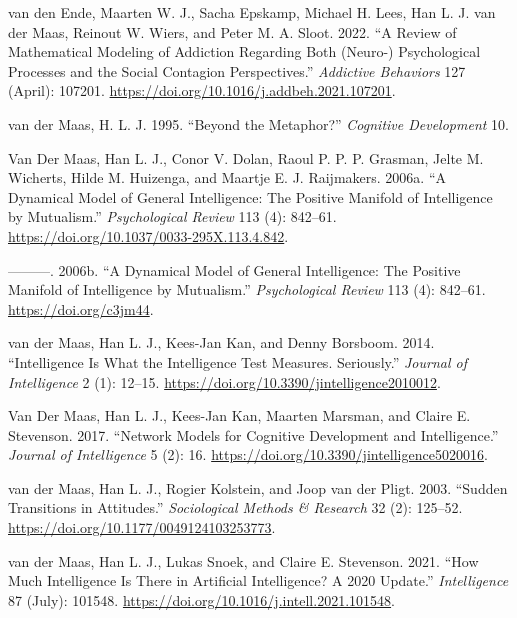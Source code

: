 \documentclass[
  a4paper,
  DIV=11,
  numbers=noendperiod,
  oneside]{scrreprt}
\newlength{\cslhangindent}
\newlength{\cslentryspacingunit} %
\newenvironment{CSLReferences}[2] %
 {%
  \setlength{\parindent}{0pt}
  \ifodd #1
  \let\oldpar\par
  \def\par{\hangindent=\cslhangindent\oldpar}
  \fi
  \setlength{\parskip}{#2\cslentryspacingunit}
 }%
 {}
\begin{document}
\begin{CSLReferences}{1}{0}
\leavevmode{}%
van den Ende, Maarten W. J., Sacha Epskamp, Michael H. Lees, Han L. J.
van der Maas, Reinout W. Wiers, and Peter M. A. Sloot. 2022. {``A Review
of Mathematical Modeling of Addiction Regarding Both (Neuro-)
Psychological Processes and the Social Contagion Perspectives.''}
\emph{Addictive Behaviors} 127 (April): 107201.
\url{https://doi.org/10.1016/j.addbeh.2021.107201}.

\leavevmode{}%
van der Maas, H. L. J. 1995. {``Beyond the Metaphor?''} \emph{Cognitive
Development} 10.

\leavevmode{}%
Van Der Maas, Han L. J., Conor V. Dolan, Raoul P. P. P. Grasman, Jelte
M. Wicherts, Hilde M. Huizenga, and Maartje E. J. Raijmakers. 2006a.
{``A Dynamical Model of General Intelligence: The Positive Manifold of
Intelligence by Mutualism.''} \emph{Psychological Review} 113 (4):
842--61. \url{https://doi.org/10.1037/0033-295X.113.4.842}.

\leavevmode{}%
---------. 2006b. {``A Dynamical Model of General Intelligence: {The}
Positive Manifold of Intelligence by Mutualism.''} \emph{Psychological
Review} 113 (4): 842--61. \url{https://doi.org/c3jm44}.

\leavevmode{}%
van der Maas, Han L. J., Kees-Jan Kan, and Denny Borsboom. 2014.
{``Intelligence {Is What} the {Intelligence Test Measures}.
{Seriously}.''} \emph{Journal of Intelligence} 2 (1): 12--15.
\url{https://doi.org/10.3390/jintelligence2010012}.

\leavevmode{}%
Van Der Maas, Han L. J., Kees-Jan Kan, Maarten Marsman, and Claire E.
Stevenson. 2017. {``Network {Models} for {Cognitive Development} and
{Intelligence}.''} \emph{Journal of Intelligence} 5 (2): 16.
\url{https://doi.org/10.3390/jintelligence5020016}.

\leavevmode{}%
van der Maas, Han L. J., Rogier Kolstein, and Joop van der Pligt. 2003.
{``Sudden {Transitions} in {Attitudes}.''} \emph{Sociological Methods \&
Research} 32 (2): 125--52.
\url{https://doi.org/10.1177/0049124103253773}.

\leavevmode{}%
van der Maas, Han L. J., Lukas Snoek, and Claire E. Stevenson. 2021.
{``How Much Intelligence Is There in Artificial Intelligence? {A} 2020
Update.''} \emph{Intelligence} 87 (July): 101548.
\url{https://doi.org/10.1016/j.intell.2021.101548}.


\end{CSLReferences}
\end{document}
